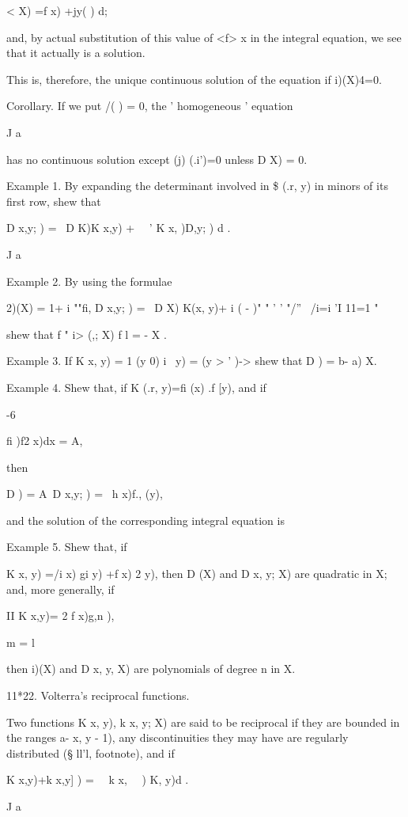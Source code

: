 < X) =f x) +jy( ) d;

and, by actual substitution of this value of <f> x in the integral
equation, we see that it actually is a solution.

This is, therefore, the unique continuous solution of the equation if
i)(X)4=0.

Corollary. If we put /( ) = 0, the ' homogeneous ' equation

J a

has no continuous solution except (j) (.i')=0 unless D X) = 0.

Example 1. By expanding the determinant involved in \$ (.r, y) in
minors of its first row, shew that

D x,y; ) = \ D K)K x,y) + \ \ ' K x, )D,y; ) d .

J a

Example 2. By using the formulae

2)(X) = 1+ i ""fi, D x,y; ) = \ D X) K(x, y)+ i ( - )" " ' ' "/'' \
/i=i 'I 11=1 " 

shew that f " i> (,; X) f l = - X .

Example 3. If K x, y) = 1 (y 0) i \ y) = (y > ' )-> shew that D ) = b-
a) X.

Example 4. Shew that, if K (.r, y)=fi (x) .f [y), and if

-6

fi )f2 x)dx = A,

then

D ) = A\ D x,y; ) = \ h x)f., (y),

and the solution of the corresponding integral equation is

%
%

Example 5. Shew that, if

K x, y) =/i x) gi y) +f x) 2 y), then D (X) and D x, y; X) are
quadratic in X; and, more generally, if

II K x,y)= 2 f x)g,n ),

m = l

then i)(X) and D x, y, X) are polynomials of degree n in X.

11*22. Volterra's reciprocal functions.

Two functions K x, y), k x, y; X) are said to be reciprocal if they
are bounded in the ranges a- x, y - 1), any discontinuities they may
have are regularly distributed (§ ll'l, footnote), and if

K x,y)+k x,y] ) = \ \ k x, \ \ ) K, y)d .

J a

